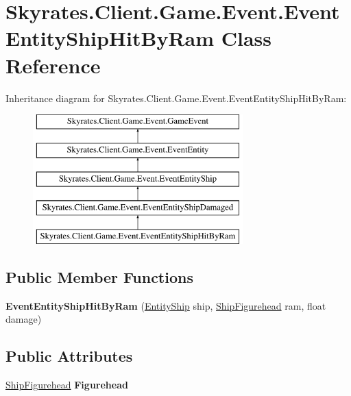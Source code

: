\hypertarget{class_skyrates_1_1_client_1_1_game_1_1_event_1_1_event_entity_ship_hit_by_ram}{\section{Skyrates.\-Client.\-Game.\-Event.\-Event\-Entity\-Ship\-Hit\-By\-Ram Class Reference}
\label{class_skyrates_1_1_client_1_1_game_1_1_event_1_1_event_entity_ship_hit_by_ram}
}
Inheritance diagram for Skyrates.\-Client.\-Game.\-Event.\-Event\-Entity\-Ship\-Hit\-By\-Ram\-:\begin{figure}[H]
\begin{center}
\leavevmode
\includegraphics[height=5.000000cm]{class_skyrates_1_1_client_1_1_game_1_1_event_1_1_event_entity_ship_hit_by_ram}
\end{center}
\end{figure}
\subsection*{Public Member Functions}
\begin{DoxyCompactItemize}
\item 
\hypertarget{class_skyrates_1_1_client_1_1_game_1_1_event_1_1_event_entity_ship_hit_by_ram_af06b152e8720d3e0fae13c4ea0da8adf}{{\bfseries Event\-Entity\-Ship\-Hit\-By\-Ram} (\hyperlink{class_skyrates_1_1_common_1_1_entity_1_1_entity_ship}{Entity\-Ship} ship, \hyperlink{class_skyrates_1_1_client_1_1_ship_1_1_ship_figurehead}{Ship\-Figurehead} ram, float damage)}\label{class_skyrates_1_1_client_1_1_game_1_1_event_1_1_event_entity_ship_hit_by_ram_af06b152e8720d3e0fae13c4ea0da8adf}

\end{DoxyCompactItemize}
\subsection*{Public Attributes}
\begin{DoxyCompactItemize}
\item 
\hypertarget{class_skyrates_1_1_client_1_1_game_1_1_event_1_1_event_entity_ship_hit_by_ram_a139003403af668e386ef09085511a81c}{\hyperlink{class_skyrates_1_1_client_1_1_ship_1_1_ship_figurehead}{Ship\-Figurehead} {\bfseries Figurehead}}\label{class_skyrates_1_1_client_1_1_game_1_1_event_1_1_event_entity_ship_hit_by_ram_a139003403af668e386ef09085511a81c}

\end{DoxyCompactItemize}
